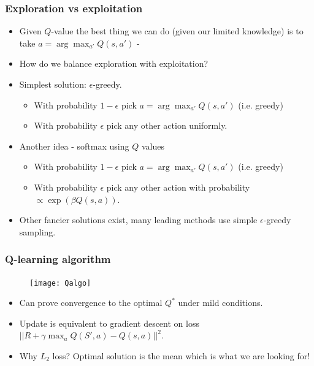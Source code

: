 \documentclass[handout]{beamer}
\begin{document}
\begin{frame}\frametitle{Exploration vs exploitation}\small
\begin{itemize}
	\item Given $Q$-value the best thing we can do (given our limited knowledge) is to take $a=\arg\max_{a'}Q(s,a')$ - 
	\onslide<2->\item How do we balance exploration with exploitation?
	\onslide<3->\item Simplest solution: $\epsilon$-greedy. 
	\begin{itemize}
		\item With probability $1-\epsilon$ pick $a=\arg\max_{a'}Q(s,a')$ (i.e. greedy)
		\item With probability $\epsilon$ pick any other action uniformly.
	\end{itemize} 
	\item Another idea - softmax using $Q$ values
	\begin{itemize}
		\item With probability $1-\epsilon$ pick $a=\arg\max_{a'}Q(s,a')$ (i.e. greedy)
		\item With probability $\epsilon$ pick any other action with probability $\propto\exp(\beta Q(s,a))$.
	\end{itemize} 
	\item Other fancier solutions exist, many leading methods use simple $\epsilon$-greedy sampling.
	
\end{itemize}
\end{frame}


\begin{frame}\frametitle{Q-learning algorithm}\small
\vspace{-0.5cm}
\begin{figure}
	 \texttt{[image: Qalgo]}
 \end{figure}
\vspace{-0.5cm}
\begin{itemize}
	\item Can prove convergence to the optimal $Q^*$ under mild conditions.
	\onslide<3->\item Update is equivalent to gradient descent on loss $||R+\gamma\max_a Q(S',a)-Q(s,a)||^2$.
	\onslide<4->\item Why $L_2$ loss? Optimal solution is the mean which is what we are looking for!
	
\end{itemize}
\end{frame}
\end{document}
